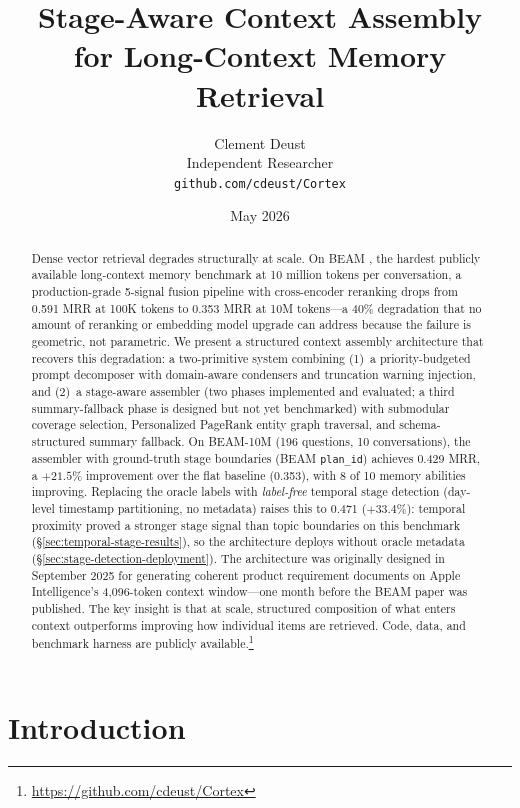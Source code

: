 \documentclass[11pt]{article}
\title{Stage-Aware Context Assembly\\for Long-Context Memory Retrieval}
\author{
  Clement Deust\\
  Independent Researcher\\
  \texttt{github.com/cdeust/Cortex}
}
\date{May 2026}
\begin{document}
\maketitle

\begin{abstract}
Dense vector retrieval degrades structurally at scale.
On BEAM \citep{Tavakoli2026}, the hardest publicly available
long-context memory benchmark at 10 million tokens per conversation,
a production-grade 5-signal fusion pipeline with cross-encoder
reranking drops from 0.591 MRR at 100K tokens to 0.353 MRR at
10M tokens---a 40\% degradation that no amount of reranking or
embedding model upgrade can address because the failure is geometric,
not parametric.
We present a structured context assembly architecture that recovers
this degradation: a two-primitive system combining
(1)~a priority-budgeted prompt decomposer with domain-aware
condensers and truncation warning injection, and
(2)~a stage-aware assembler (two phases implemented and evaluated;
a third summary-fallback phase is designed but not yet benchmarked) with submodular coverage
selection, Personalized PageRank entity graph traversal, and
schema-structured summary fallback.
On BEAM-10M (196 questions, 10 conversations), the assembler with
ground-truth stage boundaries (BEAM \texttt{plan\_id}) achieves 0.429
MRR, a $+21.5\%$ improvement over the flat baseline (0.353), with 8
of 10 memory abilities improving.  Replacing the oracle labels with
\emph{label-free} temporal stage detection (day-level timestamp
partitioning, no metadata) raises this to 0.471 ($+33.4\%$):
temporal proximity proved a stronger stage signal than topic
boundaries on this benchmark
(\S\ref{sec:temporal-stage-results}), so the architecture deploys
without oracle metadata
(\S\ref{sec:stage-detection-deployment}).
The architecture was originally designed in September 2025 for
generating coherent product requirement documents on Apple
Intelligence's 4,096-token context window---one month before the
BEAM paper was published.
The key insight is that at scale, structured composition of what
enters context outperforms improving how individual items are
retrieved.
Code, data, and benchmark harness are publicly available.\footnote{\url{https://github.com/cdeust/Cortex}}
\end{abstract}

\section{Introduction}
\label{sec:intro}
\end{document}
